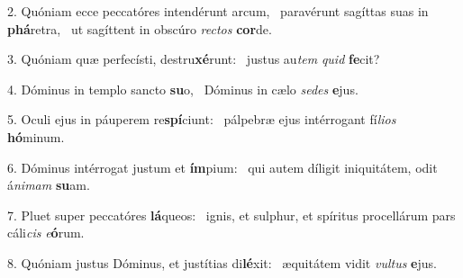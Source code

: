 2. Quóniam ecce peccatóres intendérunt arcum, \dag\  paravérunt sagíttas suas in \textbf{phá}retra, \ast\  ut sagíttent in obscúro \textit{rec}\textit{tos} \textbf{cor}de.\

3. Quóniam quæ perfecísti, destru\textbf{xé}runt: \ast\  justus au\textit{tem} \textit{quid} \textbf{fe}cit?\

4. Dóminus in templo sancto \textbf{su}o, \ast\  Dóminus in cælo \textit{se}\textit{des} \textbf{e}jus.\

5. Oculi ejus in páuperem re\textbf{spí}ciunt: \ast\  pálpebræ ejus intérrogant fí\textit{li}\textit{os} \textbf{hó}minum.\

6. Dóminus intérrogat justum et \textbf{ím}pium: \ast\  qui autem díligit iniquitátem, odit á\textit{ni}\textit{mam} \textbf{su}am.\

7. Pluet super peccatóres \textbf{lá}queos: \ast\  ignis, et sulphur, et spíritus procellárum pars cáli\textit{cis} \textit{e}\textbf{ó}rum.\

8. Quóniam justus Dóminus, et justítias di\textbf{lé}xit: \ast\  æquitátem vidit \textit{vul}\textit{tus} \textbf{e}jus.\

